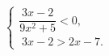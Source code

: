 \begin{ex}[type=ineq_system]
	\begin{condition}
		$\begin{cases} \dfrac{3x - 2}{9x^2 + 5}<0  ,\\
			\; 3x - 2>2x - 7  .
		\end{cases}$
	\end{condition}
\end{ex}